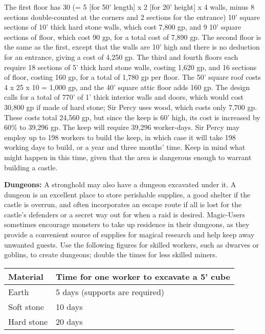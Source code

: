 \documentclass[a4paper,twoside,openany,10pt]{book}
\begin{document}
\begin{multicols}{2}
The first floor has 30 (= 5 {[}for 50' length{]} x 2 {[}for 20' height{]} x 4 walls, minus 8 sections double-counted at the corners and 2 sections for the entrance) 10' square sections of 10' thick hard stone walls, which cost 7,800 gp, and 9 10' square sections of floor, which cost 90 gp, for a total cost of 7,890 gp. The second floor is the same as the first, except that the walls are 10' high and there is no deduction for an entrance, giving a cost of 4,250 gp. The third and fourth floors each require 18 sections of 5' thick hard stone walls, costing 1,620 gp, and 16 sections of floor, costing 160 gp, for a total of 1,780 gp per floor. The 50' square roof costs 4 x 25 x 10 = 1,000 gp, and the 40' square attic floor adds 160 gp. The design calls for a total of 770' of 1' thick interior walls and doors, which would cost 30,800 gp if made of hard stone; Sir Percy uses wood, which costs only 7,700 gp. These costs total 24,560 gp, but since the keep is 60' high, its cost is increased by 60\% to 39,296 gp. The keep will require 39,296 worker-days. Sir Percy may employ up to 198 workers to build the keep, in which case it will take 198 working days to build, or a year and three months' time. Keep in mind what might happen in this time, given that the area is dangerous enough to warrant building a castle.

\textbf{Dungeons: }A stronghold may also have a dungeon excavated under it. A dungeon is an excellent place to store perishable supplies, a good shelter if the castle is overrun, and often incorporates an escape route if all is lost for the castle's defenders or a secret way out for when a raid is desired. Magic-Users sometimes encourage monsters to take up residence in their dungeons, as they provide a convenient source of supplies for magical research and help keep away unwanted guests. Use the following figures for skilled workers, such as dwarves or goblins, to create dungeons; double the times for less skilled miners.\medskip

\begin{tabularx}{0.45\textwidth}{lX}
\textbf{Material} & \textbf{Time for one worker to excavate a 5' cube} \\\toprule
{Earth} & {5 days (supports are required)} \\\hline
{Soft stone} & {10 days} \\\hline
{Hard stone} & {20 days} \\\bottomrule
\end{tabularx}\medskip


\end{multicols}
\end{document}
